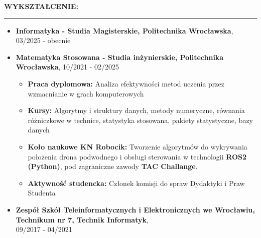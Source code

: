 \documentclass[10pt]{article}
\newcommand{\longline}{\rule{19.6cm}{1pt}}
\begin{document}
\newpage
\vspace*{10pt}
\noindent \fontsize{14pt}{14pt}\selectfont \textbf{\color{Violet}WYKSZTAŁCENIE:}
\fontsize{10pt}{10pt}\selectfont 
\\ 
\noindent \longline 
\begin{itemize}[leftmargin=*]
    \item \textbf{Informatyka - Studia Magisterskie, Politechnika Wrocławska}, 03/2025 - obecnie
    \item \textbf{Matematyka Stosowana - Studia inżynierskie, Politechnika Wrocławska}, 10/2021 - 02/2025
    \begin{itemize}
    \item \textbf{Praca dyplomowa:} Analiza efektywności metod uczenia przez wzmacnianie w grach komputerowych
    \item \textbf{Kursy:} Algorytmy i struktury danych, metody numeryczne, równania różniczkowe w technice, statystyka stosowana, pakiety statystyczne, bazy danych
    \item \textbf{Koło naukowe KN Robocik:} Tworzenie algorytmów do wykrywania położenia drona podwodnego i obsługi sterowania w technologii \textbf{ROS2 (Python)}, pod zagraniczne zawody \textbf{TAC Challange}. 
    \item \textbf{Aktywność studencka:} Członek komisji do spraw Dydaktyki i Praw Studenta
    \end{itemize}
    \item \textbf{Zespół Szkół Teleinformatycznych i Elektronicznych we Wrocławiu, Technikum nr 7, Technik Informatyk}, \\
    09/2017 - 04/2021 
\end{itemize}
\end{document}
